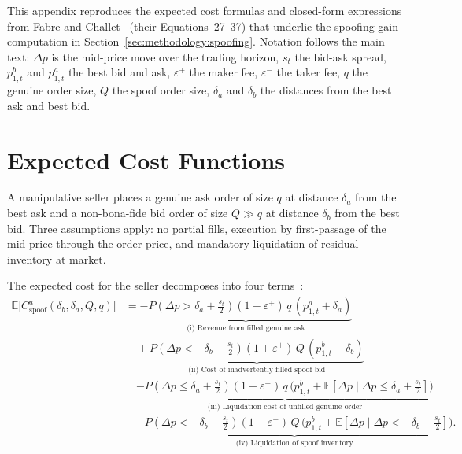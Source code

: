 \documentclass[11pt]{report}
\begin{document}
This appendix reproduces the expected cost formulas and closed-form expressions from Fabre and Challet~\cite{fabre_2025} (their Equations~27--37) that underlie the spoofing gain computation in Section~\ref{sec:methodology:spoofing}. Notation follows the main text: $\Delta p$ is the mid-price move over the trading horizon, $s_t$ the bid-ask spread, $p^b_{1,t}$ and $p^a_{1,t}$ the best bid and ask, $\varepsilon^+$ the maker fee, $\varepsilon^-$ the taker fee, $q$ the genuine order size, $Q$ the spoof order size, $\delta_a$ and $\delta_b$ the distances from the best ask and best bid.

\section{Expected Cost Functions}\label{app:spoofing:cost}

A manipulative seller places a genuine ask order of size $q$ at distance $\delta_a$ from the best ask and a non-bona-fide bid order of size $Q \gg q$ at distance $\delta_b$ from the best bid. Three assumptions apply: no partial fills, execution by first-passage of the mid-price through the order price, and mandatory liquidation of residual inventory at market.

The expected cost for the seller decomposes into four terms~\cite{fabre_2025}:
\begin{align}
  \mathbb{E}\!\bigl[C^a_{\text{spoof}}(\delta_b, \delta_a, Q, q)\bigr]
  &= \underbrace{-P\!\left(\Delta p > \delta_a + \tfrac{s_t}{2}\right)(1 - \varepsilon^+)\, q\,(p^a_{1,t} + \delta_a)}_{\text{(i) Revenue from filled genuine ask}} \nonumber \\[4pt]
  &\quad + \underbrace{P\!\left(\Delta p < -\delta_b - \tfrac{s_t}{2}\right)(1 + \varepsilon^+)\, Q\,(p^b_{1,t} - \delta_b)}_{\text{(ii) Cost of inadvertently filled spoof bid}} \nonumber \\[4pt]
  &\quad \underbrace{- P\!\left(\Delta p \leq \delta_a + \tfrac{s_t}{2}\right)(1 - \varepsilon^-)\, q\,\bigl(p^b_{1,t} + \mathbb{E}[\Delta p \mid \Delta p \leq \delta_a + \tfrac{s_t}{2}]\bigr)}_{\text{(iii) Liquidation cost of unfilled genuine order}} \nonumber \\[4pt]
  &\quad \underbrace{- P\!\left(\Delta p < -\delta_b - \tfrac{s_t}{2}\right)(1 - \varepsilon^-)\, Q\,\bigl(p^b_{1,t} + \mathbb{E}[\Delta p \mid \Delta p < -\delta_b - \tfrac{s_t}{2}]\bigr)}_{\text{(iv) Liquidation of spoof inventory}}.
  \label{eq:app_seller_cost}
\end{align}
\end{document}
